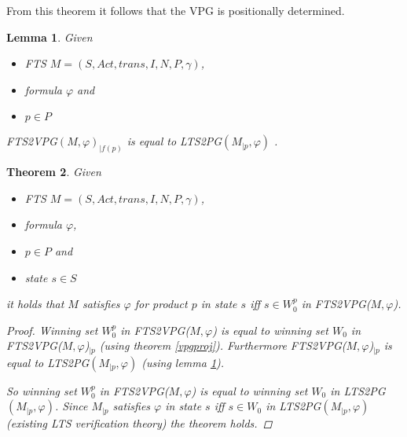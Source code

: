 \documentclass[]{article}
\newtheorem{theorem}{Theorem}[section]
\newtheorem{lemma}[theorem]{Lemma}
\begin{document}
From this theorem it follows that the VPG is positionally determined.

\begin{lemma}
	\label{vpgftsproj}
	Given 
	\begin{itemize}
		\item FTS $M = (S, Act, trans, I, N, P, \gamma)$,
		\item formula $\varphi$ and
		\item $p \in P$
	\end{itemize}
	FTS2VPG$(M, \varphi)_{|f(p)}$ is equal to LTS2PG$(M_{|p},\varphi)$ .
\end{lemma}

\begin{theorem}
	Given
	\begin{itemize}
		\item FTS $M = (S, Act, trans, I, N, P, \gamma)$,
		\item formula $\varphi$,
		\item $p \in P$ and
		\item state $s \in S$
	\end{itemize}
it holds that $M$ satisfies $\varphi$ for product $p$ in state $s$ iff $s \in W_0^p$ in FTS2VPG($M, \varphi$).
\begin{proof}
	
	Winning set $W_0^p$ in FTS2VPG($M, \varphi$) is equal to winning set $W_0$ in FTS2VPG($M, \varphi$)$_{|p}$ (using theorem \ref{vpgproj}). Furthermore FTS2VPG($M, \varphi$)$_{|p}$ is equal to LTS2PG$(M_{|p}, \varphi)$ (using lemma \ref{vpgftsproj}).
	
	So winning set  $W_0^p$ in FTS2VPG($M, \varphi$) is equal to winning set $W_0$ in LTS2PG$(M_{|p}, \varphi)$.
	Since $M_{|p}$ satisfies $\varphi$ in state $s$ iff $s \in W_0$ in LTS2PG$(M_{|p}, \varphi)$ (existing LTS verification theory) the theorem holds.
\end{proof}
\end{theorem}
 

\end{document}
